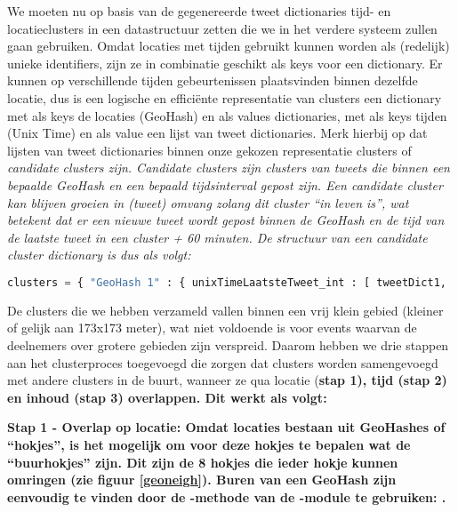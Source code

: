 {{We moeten nu op basis van de gegenereerde tweet dictionaries tijd- en 
locatieclusters in een datastructuur zetten die we in het verdere systeem zullen 
gaan gebruiken. Omdat locaties met tijden gebruikt kunnen worden als (redelijk) 
unieke identifiers, zijn ze in combinatie geschikt als keys voor een dictionary. 
Er kunnen op verschillende tijden gebeurtenissen plaatsvinden binnen dezelfde 
locatie, dus is een logische en efficiënte representatie van clusters een 
dictionary met als keys de locaties (GeoHash) en als values dictionaries, met als 
keys tijden (Unix Time) en als value een lijst van tweet dictionaries.  
\vl
Merk hierbij op dat lijsten van tweet dictionaries binnen onze gekozen 
representatie clusters of \it{candidate clusters} zijn. Candidate clusters zijn 
clusters van tweets die binnen een bepaalde GeoHash en een bepaald tijdsinterval 
gepost zijn. Een candidate cluster kan blijven groeien in (tweet) omvang zolang 
dit cluster “in leven is”, wat betekent dat er een nieuwe tweet wordt gepost 
binnen de GeoHash en de tijd van de laatste tweet in een cluster + 60 minuten.
\vl
De structuur van een candidate cluster dictionary is dus als volgt:

\begin{lstlisting}[language=Python]
clusters = { "GeoHash 1" : { unixTimeLaatsteTweet_int : [ tweetDict1, ...], ...}, ...}
\end{lstlisting}
\vspace*{-10pt}

\label{ClusterMerger}

De clusters die we hebben verzameld vallen binnen een vrij klein gebied (kleiner 
of gelijk aan 173x173 meter), wat niet voldoende is voor events waarvan de 
deelnemers over grotere gebieden zijn verspreid. Daarom hebben we drie stappen 
aan het clusterproces toegevoegd die zorgen dat clusters worden samengevoegd met 
andere clusters in de buurt, wanneer ze qua locatie (\bf{stap 1}), tijd (\bf{stap 2}) en 
inhoud (\bf{stap 3}) overlappen. Dit werkt als volgt:

\begin{bullets}
\item \bf{Stap 1 - Overlap op locatie}: Omdat locaties bestaan uit GeoHashes of 
“hokjes”, is het mogelijk om voor deze hokjes te bepalen wat de “buurhokjes” 
zijn. Dit zijn de 8 hokjes die ieder hokje kunnen omringen (zie figuur \ref{geoneigh}). Buren 
van een GeoHash zijn eenvoudig te vinden door de -methode van de 
-module te gebruiken: .


\end{bullets}}}
